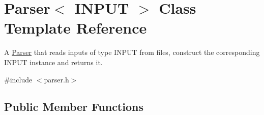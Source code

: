 \hypertarget{classParser}{}\section{Parser$<$ I\+N\+P\+UT $>$ Class Template Reference}
\label{classParser}


A \hyperlink{classParser}{Parser} that reads inputs of type I\+N\+P\+UT from files, construct the corresponding I\+N\+P\+UT instance and returns it.  




{\ttfamily \#include $<$parser.\+h$>$}

\subsection*{Public Member Functions}
